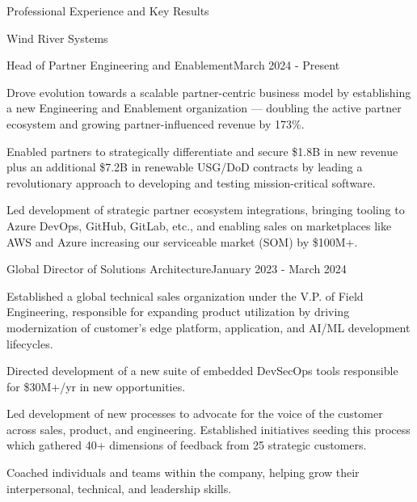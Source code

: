 \documentclass{resume} %
\begin{document}

\begin{rSection}{Professional Experience and Key Results}

  \begin{rCompany}{Wind River Systems}{}{}
    \begin{rRole}{Head of Partner Engineering and Enablement}{}{March 2024 - Present}
      \item Drove evolution towards a scalable partner-centric business model by establishing a new Engineering and Enablement organization --- doubling the active partner ecosystem and growing partner-influenced revenue by 173\%.
      \item Enabled partners to strategically differentiate and secure \$1.8B in new revenue plus an additional \$7.2B in renewable USG/DoD contracts by leading a revolutionary approach to developing and testing mission-critical software.
      \item Led development of strategic partner ecosystem integrations, bringing tooling to Azure DevOps, GitHub, GitLab, etc., and enabling sales on marketplaces like AWS and Azure increasing our serviceable market (SOM) by \$100M+.
    \end{rRole}
    
    \begin{rRole}{Global Director of Solutions Architecture}{}{January 2023 - March 2024}
      \item Established a global technical sales organization under the V.P. of Field Engineering, responsible for expanding product utilization by driving modernization of customer's edge platform, application, and AI/ML development lifecycles.
      \item Directed development of a new suite of embedded DevSecOps tools responsible for \$30M+/yr in new opportunities.
      \item Led development of new processes to advocate for the voice of the customer across sales, product, and engineering. Established initiatives seeding this process which gathered 40+ dimensions of feedback from 25 strategic customers.
      \item Coached individuals and teams within the company, helping grow their interpersonal, technical, and leadership skills.
    \end{rRole}
  \end{rCompany}


\end{rSection}
\end{document}
